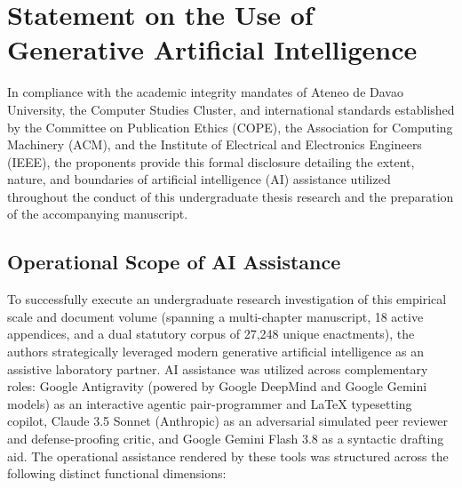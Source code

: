 
\chapter*{Statement on the Use of Generative Artificial Intelligence}

In compliance with the academic integrity mandates of Ateneo de Davao University, the Computer Studies Cluster, and international standards established by the Committee on Publication Ethics (COPE), the Association for Computing Machinery (ACM), and the Institute of Electrical and Electronics Engineers (IEEE), the proponents provide this formal disclosure detailing the extent, nature, and boundaries of artificial intelligence (AI) assistance utilized throughout the conduct of this undergraduate thesis research and the preparation of the accompanying manuscript.

\section*{Operational Scope of AI Assistance}

To successfully execute an undergraduate research investigation of this empirical scale and document volume (spanning a multi-chapter manuscript, 18 active appendices, and a dual statutory corpus of 27,248 unique enactments), the authors strategically leveraged modern generative artificial intelligence as an assistive laboratory partner. AI assistance was utilized across complementary roles: Google Antigravity (powered by Google DeepMind and Google Gemini models) as an interactive agentic pair-programmer and LaTeX typesetting copilot, Claude 3.5 Sonnet (Anthropic) as an adversarial simulated peer reviewer and defense-proofing critic, and Google Gemini Flash 3.8 as a syntactic drafting aid. The operational assistance rendered by these tools was structured across the following distinct functional dimensions:

